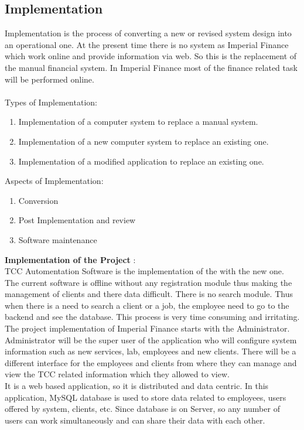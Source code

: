 \subsection{Implementation}
Implementation is the process of converting a new or revised system design into an operational one. At the
present time there is no system as Imperial Finance which work online and provide information via web.
So this is the replacement of the manual financial system. In Imperial Finance most of the finance related
task will be performed online.\\\\
Types of Implementation:
\begin{enumerate}
\item Implementation of a computer system to replace a manual system.
\item Implementation of a new computer system to replace an existing one.
\item Implementation of a modified application to replace an existing one.
\end{enumerate}
\vskip 0.5cm
Aspects of Implementation:
\begin{enumerate}
\item Conversion
\item Post Implementation and review
\item Software maintenance
\end{enumerate}
\vskip 0.5cm
{\bf Implementation of the Project }:\\
TCC Automentation Software is the implementation of the with the new one. The current software is offline without any registration module thus making the management of clients and there data difficult. There is no search module. Thus when there is a need to search a client or a job, the employee need to go to the backend and see the database. This process
is very time consuming and irritating. The project implementation of Imperial Finance starts with the
Administrator. Administrator will be the super user of the application who will configure system
information such as new services, lab, employees and new clients. There will be a different
interface for the employees and clients from where they can manage and view the TCC related
information which they allowed to view.\\
It is a web based application, so it is distributed and data centric. In this application, MySQL database is
used to store data related to employees, users offered by system, clients, etc. Since database is on Server,
so any number of users can work simultaneously and can share their data with each other.\\\\
